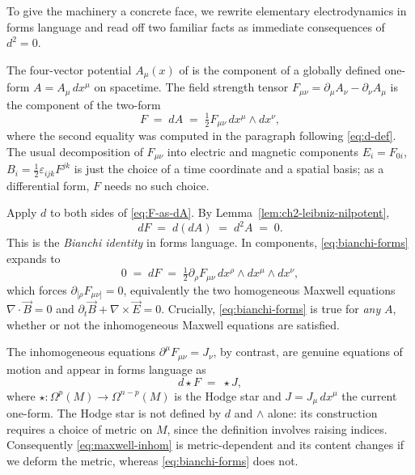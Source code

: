 To give the machinery a concrete face, we rewrite elementary electrodynamics in forms language and read off two familiar facts as immediate consequences of $d^2 = 0$.

\begin{example}\label{ex:maxwell-forms}
The four-vector potential $A_\mu(x)$ of \cite[Ch.~8]{Schwartz2014QFT} is the component of a globally defined one-form $A = A_\mu\,dx^\mu$ on spacetime. The field strength tensor $F_{\mu\nu} = \partial_\mu A_\nu - \partial_\nu A_\mu$ is the component of the two-form
\begin{equation}\label{eq:F-as-dA}
F \;=\; dA \;=\; \tfrac{1}{2}F_{\mu\nu}\,dx^\mu\wedge dx^\nu,
\end{equation}
where the second equality was computed in the paragraph following \eqref{eq:d-def}. The usual decomposition of $F_{\mu\nu}$ into electric and magnetic components $E_i = F_{0i}$, $B_i = \tfrac{1}{2}\varepsilon_{ijk}F^{jk}$ is just the choice of a time coordinate and a spatial basis; as a differential form, $F$ needs no such choice.

\medskip

\noindent Apply $d$ to both sides of \eqref{eq:F-as-dA}. By Lemma~\ref{lem:ch2-leibniz-nilpotent},
\begin{equation}\label{eq:bianchi-forms}
dF \;=\; d(dA) \;=\; d^2 A \;=\; 0.
\end{equation}
This is the \emph{Bianchi identity} in forms language. In components, \eqref{eq:bianchi-forms} expands to
\begin{equation*}
0 \;=\; dF \;=\; \tfrac{1}{2}\partial_\rho F_{\mu\nu}\,dx^\rho\wedge dx^\mu\wedge dx^\nu,
\end{equation*}
which forces $\partial_{[\rho}F_{\mu\nu]} = 0$, equivalently the two homogeneous Maxwell equations $\nabla\cdot\vec{B} = 0$ and $\partial_t\vec{B} + \nabla\times\vec{E} = 0$. Crucially, \eqref{eq:bianchi-forms} is true for \emph{any} $A$, whether or not the inhomogeneous Maxwell equations are satisfied.

\medskip

\noindent The inhomogeneous equations $\partial^\mu F_{\mu\nu} = J_\nu$, by contrast, are genuine equations of motion and appear in forms language as
\begin{equation}\label{eq:maxwell-inhom}
d \star F \;=\; \star J,
\end{equation}
where $\star : \Omega^p(M) \to \Omega^{n-p}(M)$ is the Hodge star and $J = J_\mu\, dx^\mu$ the current one-form. The Hodge star is not defined by $d$ and $\wedge$ alone: its construction requires a choice of metric on $M$, since the definition involves raising indices. Consequently \eqref{eq:maxwell-inhom} is metric-dependent and its content changes if we deform the metric, whereas \eqref{eq:bianchi-forms} does not.


\end{example}

